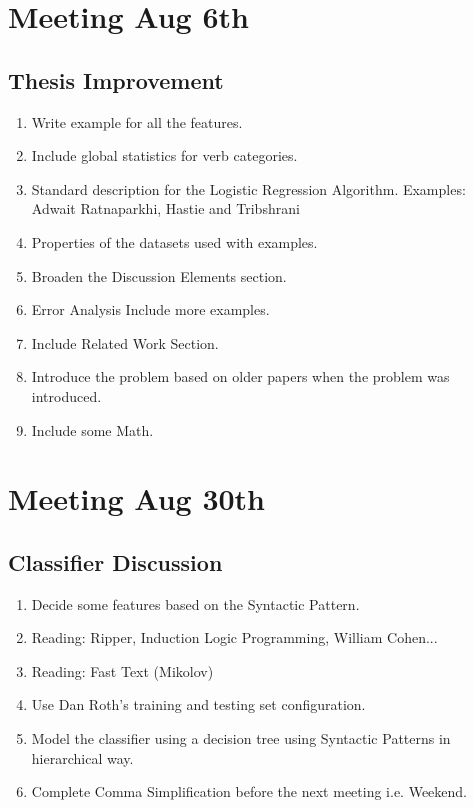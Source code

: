 \documentclass[11pt]{article}
\begin{document}
\section{Meeting Aug 6th}
\subsection{Thesis Improvement}
\begin{enumerate}
\item  Write example for all the features.
\item Include global statistics  for verb categories.
\item Standard description for the Logistic Regression Algorithm. Examples: Adwait Ratnaparkhi, Hastie and Tribshrani
\item Properties of the datasets used with examples.
\item Broaden the Discussion Elements section.
\item Error Analysis Include more examples.
\item Include Related Work Section.
\item Introduce the problem based on older papers when the problem was introduced.
\item Include some Math.
\end{enumerate}

\section{Meeting Aug 30th}
\subsection{Classifier Discussion}
\begin{enumerate}
\item  Decide some features based on the Syntactic Pattern.
\item Reading: Ripper, Induction Logic Programming, William Cohen...
\item Reading: Fast Text (Mikolov)
\item Use Dan Roth's training and testing set configuration.
\item Model the classifier using a decision tree using Syntactic Patterns in hierarchical way.
\item Complete Comma Simplification before the next meeting i.e. Weekend.
\end{enumerate}
\end{document}
